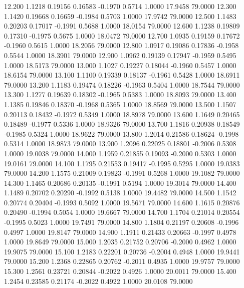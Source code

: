   12.200   1.1218   0.19156   0.16583  -0.1970   0.5714   1.0000  17.9458  79.0000
  12.300   1.1420   0.19668   0.16659  -0.1984   0.5703   1.0000  17.9742  79.0000
  12.500   1.1483   0.20203   0.17017  -0.1991   0.5688   1.0000  18.0154  79.0000
  12.600   1.1238   0.19809   0.17310  -0.1975   0.5675   1.0000  18.0472  79.0000
  12.700   1.0935   0.19159   0.17672  -0.1960   0.5615   1.0000  18.2056  79.0000
  12.800   1.0917   0.19086   0.17836  -0.1958   0.5544   1.0000  18.3901  79.0000
  12.900   1.0962   0.19139   0.17947  -0.1959   0.5495   1.0000  18.5173  79.0000
  13.000   1.1027   0.19227   0.18044  -0.1960   0.5457   1.0000  18.6154  79.0000
  13.100   1.1100   0.19339   0.18137  -0.1961   0.5428   1.0000  18.6911  79.0000
  13.200   1.1183   0.19474   0.18226  -0.1963   0.5404   1.0000  18.7544  79.0000
  13.300   1.1277   0.19639   0.18302  -0.1965   0.5383   1.0000  18.8093  79.0000
  13.400   1.1385   0.19846   0.18370  -0.1968   0.5365   1.0000  18.8569  79.0000
  13.500   1.1507   0.20113   0.18432  -0.1972   0.5349   1.0000  18.8978  79.0000
  13.600   1.1649   0.20465   0.18489  -0.1977   0.5336   1.0000  18.9326  79.0000
  13.700   1.1816   0.20938   0.18549  -0.1985   0.5324   1.0000  18.9622  79.0000
  13.800   1.2014   0.21586   0.18624  -0.1998   0.5314   1.0000  18.9873  79.0000
  13.900   1.2096   0.22025   0.18801  -0.2006   0.5308   1.0000  19.0038  79.0000
  14.000   1.1959   0.21855   0.19093  -0.2000   0.5303   1.0000  19.0161  79.0000
  14.100   1.1795   0.21553   0.19417  -0.1995   0.5295   1.0000  19.0383  79.0000
  14.200   1.1575   0.21009   0.19823  -0.1991   0.5268   1.0000  19.1082  79.0000
  14.300   1.1465   0.20686   0.20135  -0.1991   0.5194   1.0000  19.3014  79.0000
  14.400   1.1489   0.20702   0.20290  -0.1992   0.5138   1.0000  19.4482  79.0000
  14.500   1.1542   0.20774   0.20404  -0.1993   0.5092   1.0000  19.5671  79.0000
  14.600   1.1615   0.20876   0.20490  -0.1994   0.5054   1.0000  19.6667  79.0000
  14.700   1.1704   0.21014   0.20554  -0.1995   0.5023   1.0000  19.7491  79.0000
  14.800   1.1804   0.21197   0.20608  -0.1996   0.4997   1.0000  19.8147  79.0000
  14.900   1.1911   0.21433   0.20663  -0.1997   0.4978   1.0000  19.8649  79.0000
  15.000   1.2035   0.21752   0.20706  -0.2000   0.4962   1.0000  19.9075  79.0000
  15.100   1.2183   0.22201   0.20736  -0.2004   0.4948   1.0000  19.9441  79.0000
  15.200   1.2368   0.22865   0.20762  -0.2011   0.4935   1.0000  19.9757  79.0000
  15.300   1.2561   0.23721   0.20844  -0.2022   0.4926   1.0000  20.0011  79.0000
  15.400   1.2454   0.23585   0.21174  -0.2022   0.4922   1.0000  20.0108  79.0000
